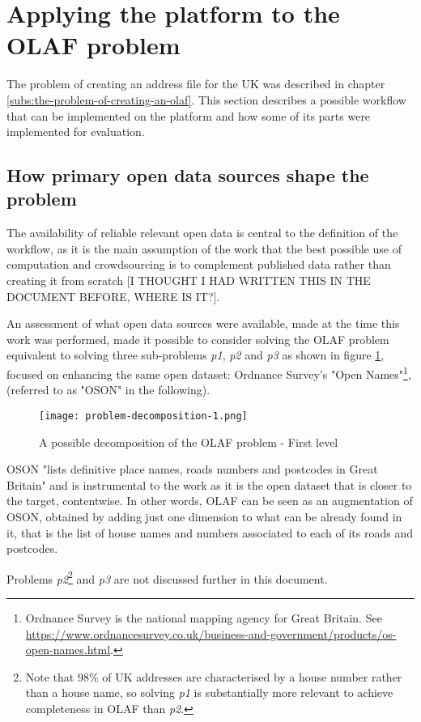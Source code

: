 \section{Applying the platform to the OLAF problem}

The problem of creating an address file for the UK was described in chapter \ref{subs:the-problem-of-creating-an-olaf}. This section describes a possible workflow that can be implemented on the platform and how some of its parts were implemented for evaluation.

\subsection{How primary open data sources shape the problem}

The availability of reliable relevant open data is central to the definition of the workflow, as it is the main assumption of the work that the best possible use of computation and crowdsourcing is to complement published data rather than creating it from scratch [I THOUGHT I HAD WRITTEN THIS IN THE DOCUMENT BEFORE, WHERE IS IT?]. 

An assessment of what open data sources were available, made at the time this work was performed, made it possible to consider solving the OLAF problem equivalent to solving three sub-problems {\it p1}, {\it p2} and {\it p3} as shown in figure \ref{fig:problem_decomposition_1}, focused on enhancing the same open dataset: Ordnance Survey's "Open Names"\footnote{Ordnance Survey is the national mapping agency for Great Britain. See \url{https://www.ordnancesurvey.co.uk/business-and-government/products/os-open-names.html}.}, (referred to as "OSON" in the following).

\begin{figure}
	\texttt{[image: problem-decomposition-1.png]}
	\caption{A possible decomposition of the OLAF problem - First level}
	\label{fig:problem_decomposition_1}
\end{figure}

OSON "lists definitive place names, roads numbers and postcodes in Great Britain" and is instrumental to the work as it is the open dataset that is closer to the target, contentwise. In other words, OLAF can be seen as an augmentation of OSON, obtained by adding just one dimension to what can be already found in it, that is the list of house names and numbers associated to each of its roads and postcodes. 
    
Problems {\it p2}\footnote{Note that 98\% of UK addresses are characterised by a house number rather than a house name, so solving {\it p1} is substantially more relevant to achieve completeness in OLAF than {\it p2}.} and {\it p3} are not discussed further in this document. 

